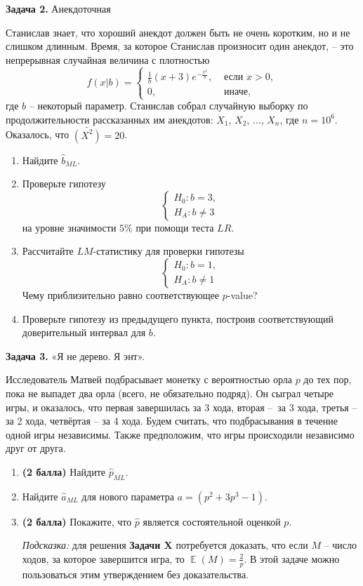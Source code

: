 \documentclass[10pt, a4paper]{extarticle}
\DeclareMathOperator{\E}{\mathbb{E}}
\begin{document}
	{\Large \textbf{Задача 2.} Анекдоточная}
	
	 Станислав знает, что хороший анекдот должен быть не очень коротким, но и не слишком длинным. Время, за которое Станислав произносит один анекдот, – это непрерывная случайная величина с плотностью
	 \[
	 f(x | b) = \begin{cases}
	 	\frac{1}{b}(x + 3)e^{-\frac{x^2}{b}}, &\text{ если } x > 0, \\
	 	0, &\text{ иначе,}
	 \end{cases}
	 \]
	 где $b$ – некоторый параметр. Станислав собрал случайную выборку по продолжительности рассказанных им анекдотов: $X_1$, $X_2$, $\ldots$, $X_n$, где $n = 10^6$. Оказалось, что $\bar{(X^2)} = 20$.
	 
	 \begin{enumerate}
	 	\item Найдите $\hat{b}_{ML}$.
	 	\item Проверьте гипотезу
	 	\[\begin{cases}
	 		H_0: b = 3, \\
	 		H_A: b \ne 3
	 	\end{cases}
	 	\]
	 	на уровне значимости $5\%$ при помощи теста $LR$.
	 	\item Рассчитайте $LM$-статистику для проверки гипотезы
	 	\[\begin{cases}
	 		H_0: b = 1, \\
	 		H_A: b \ne 1
	 	\end{cases}
	 	\]
	 	Чему приблизительно равно соответствующее $p$-value?
	 	\item Проверьте гипотезу из предыдущего пункта, построив соответствующий доверительный интервал для $b$.
	 \end{enumerate}

	{\Large \textbf{Задача 3.} «Я не дерево. Я энт».}
	
	Исследователь Матвей подбрасывает монетку с вероятностью орла $p$ до тех пор, пока не выпадет два орла (всего, не обязательно подряд). Он сыграл четыре игры, и оказалось, что первая завершилась за 3 хода, вторая – за 3 хода, третья – за 2 хода, четвёртая – за 4 хода. Будем считать, что подбрасывания в течение одной игры независимы. Также предположим, что игры происходили независимо друг от друга.
	
	\begin{enumerate}
		\item \textbf{(2 балла)} Найдите $\hat{p}_{ML}$.
		\item Найдите $\hat{a}_{ML}$ для нового параметра $a = (p^2 + 3p^3 - 1)$.
		\item \textbf{(2 балла)} Покажите, что $\hat{p}$ является состоятельной оценкой $p$.
		
		\textit{Подсказка:} для решения \textbf{Задачи X} потребуется доказать, что если $M$ – число ходов, за которое завершится игра, то $\E(M) = \frac{2}{p}$. В этой задаче можно пользоваться этим утверждением без доказательства.
	\end{enumerate}
\end{document}
